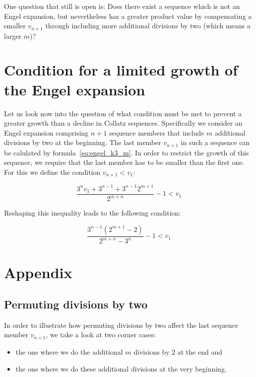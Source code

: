 \documentclass[12pt]{amsart}
\theoremstyle{definition}
\begin{document}
\par\medskip
One question that still is open is: Does there exist a sequence which is not an Engel expansion, but nevertheless has a greater product value by compensating a smaller $v_{n+1}$ through including more additional divisions by two (which means a larger $m$)?


\section{Condition for a limited growth of the Engel expansion}
\label{sec:condition_limited_growth}
Let us look now into the question of what condition must be met to prevent a greater growth than a decline in Collatz sequences. Specifically we consider an Engel expansion comprising $n+1$ sequence members that include $m$ additional divisions by two at the beginning. The last member $v_{n+1}$ in such a sequence can be calulated by formula~\ref{eq:engel_k3_m}. In order to restrict the growth of this sequence, we require that the last member has to be smaller than the first one. For this we define the condition $v_{n+1}<v_1$:

\[
\frac{3^nv_1+3^{n-1}+3^{n-1}2^{m+1}}{2^{m+n}}-1<v_1
\]

\par\medskip\noindent
Reshaping this inequality leads to the following condition:

\begin{equation}
\label{eq:condition_limited_growth}
\frac{3^{n-1}\left(2^{m+1}-2\right)}{2^{m+n}-3^n}-1<v_1
\end{equation}

\newpage
\section{Appendix}

\subsection{Permuting divisions by two}
\label{appx:permuting_divisions}
In order to illustrate how permuting divisions by two affect the last sequence member $v_{n+1}$, we take a look at two corner cases:
\begin{itemize}
	\item the one where we do the additional $m$ divisions by $2$ at the end and
	\item the one where we do these additional divisions at the very beginning.
\end{itemize}
\end{document}
